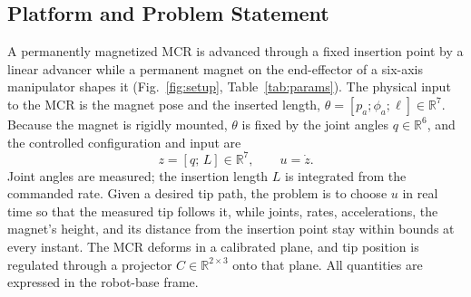 \documentclass[journal]{IEEEtran}
\begin{document}
\subsection{Platform and Problem Statement}
\label{sec:problem}

A permanently magnetized MCR is advanced through a fixed insertion point
by a linear advancer while a permanent magnet on the end-effector of a
six-axis manipulator shapes it (Fig.~\ref{fig:setup},
Table~\ref{tab:params}). The physical input to the MCR is the magnet pose
and the inserted length, $\theta=[p_a;\phi_a;\ell]\in\mathbb R^7$. Because
the magnet is rigidly mounted, $\theta$ is fixed by the joint angles
$q\in\mathbb R^6$, and the controlled configuration and input are
\begin{equation}
z=[q;\,L]\in\mathbb R^7,\qquad u=\dot z .
\label{eq:config}
\end{equation}
Joint angles are measured; the insertion length $L$ is integrated from the
commanded rate. Given a desired tip path, the problem is to choose $u$ in
real time so that the measured tip follows it, while joints, rates,
accelerations, the magnet's height, and its distance from the insertion
point stay within bounds at every instant. The MCR deforms in a calibrated
plane, and tip position is regulated through a projector
$C\in\mathbb R^{2\times3}$ onto that plane. All quantities are expressed in
the robot-base frame.
\end{document}
